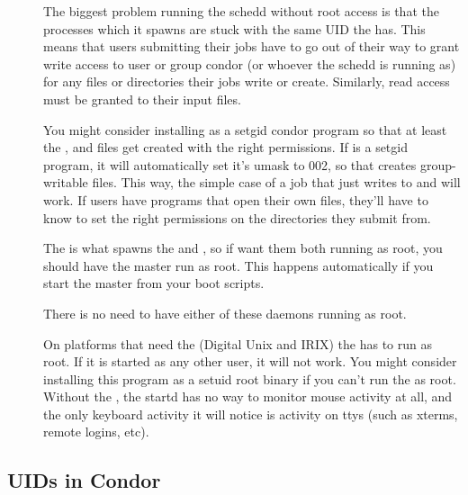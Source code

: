 \begin{description}
\item[] The biggest problem running the schedd
    without root access is that the  processes which it
    spawns are stuck with the same UID the  has.  This
    means that users submitting their jobs have to go out of their way
    to grant write access to user or group condor (or whoever the
    schedd is running as) for any files or directories their jobs
    write or create.  Similarly, read access must be granted to their
    input files.

    You might consider installing  as a setgid condor
    program so that at least the ,  and
     files get created with the right permissions.  If
     is a setgid program, it will automatically set
    it's umask to 002, so that creates group-writable files.  This
    way, the simple case of a job that just writes to 
    and  will work.  If users have programs that open
    their own files, they'll have to know to set the right permissions
    on the directories they submit from.

\item[] The  is what spawns the
     and , so if want them both running
    as root, you should have the master run as root.  This happens
    automatically if you start the master from your boot scripts.

\item[]
\item[] There is no need to have either of these
daemons running as root.

\item[] On platforms that need the  (Digital
    Unix and IRIX) the  has to run as root.  If it is
    started as any other user, it will not work.  You might consider
    installing this program as a setuid root binary if you can't run
    the  as root.  Without the , the
    startd has no way to monitor mouse activity at all, and the only
    keyboard activity it will notice is activity on ttys (such as
    xterms, remote logins, etc).

\end{description}

\subsection{\label{sec:uids}UIDs in Condor}

